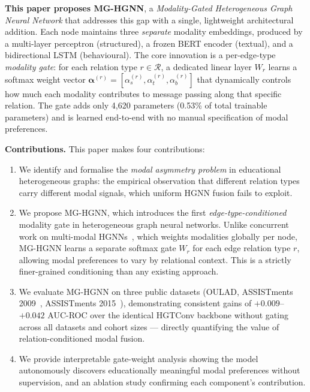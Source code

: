 \documentclass[sigconf]{acmart}
\begin{document}
\textbf{This paper proposes MG-HGNN}, a
\textit{Modality-Gated Heterogeneous Graph Neural
Network} that addresses this gap with a single,
lightweight architectural addition. Each node maintains
three \emph{separate} modality embeddings, produced by
a multi-layer perceptron (structured), a frozen BERT
encoder (textual), and a bidirectional LSTM (behavioural).
The core innovation is a per-edge-type \emph{modality
gate}: for each relation type $r \in \mathcal{R}$, a
dedicated linear layer $W_r$ learns a softmax weight
vector $\boldsymbol{\alpha}^{(r)} = [\alpha_s^{(r)},
\alpha_t^{(r)}, \alpha_b^{(r)}]$ that dynamically
controls how much each modality contributes to message
passing along that specific relation. The gate adds only
4,620 parameters (0.53\% of total trainable parameters)
and is learned end-to-end with no manual specification
of modal preferences.

\textbf{Contributions.} This paper makes four
contributions:
\begin{enumerate}
  \item We identify and formalise the \emph{modal
  asymmetry problem} in educational heterogeneous
  graphs: the empirical observation that different
  relation types carry different modal signals, which
  uniform HGNN fusion fails to exploit.
  \item We propose MG-HGNN, which introduces the first
  \emph{edge-type-conditioned} modality gate in
  heterogeneous graph neural networks. Unlike concurrent
  work on multi-modal HGNNs~\citep{bachiri2025mmhgnn},
  which weights modalities globally per node, MG-HGNN
  learns a separate softmax gate $W_r$ for each edge
  relation type $r$, allowing modal preferences to vary
  by relational context. This is a strictly
  finer-grained conditioning than any existing approach.
  \item We evaluate MG-HGNN on three public datasets
  (OULAD, ASSISTments 2009~\citep{feng2009assistments},
  ASSISTments 2015~\citep{assistments2015}),
  demonstrating consistent gains of $+0.009$--$+0.042$
  AUC-ROC over the identical HGTConv backbone without
  gating across all datasets and cohort sizes ---
  directly quantifying the value of relation-conditioned
  modal fusion.
  \item We provide interpretable gate-weight analysis
  showing the model autonomously discovers
  educationally meaningful modal preferences without
  supervision, and an ablation study confirming each
  component's contribution.
\end{enumerate}
\end{document}
